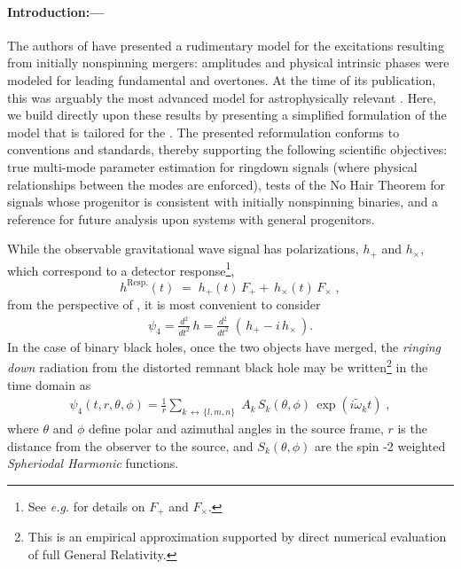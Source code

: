 \documentclass[twocolumn,prd,floatfix,preprintnumbers,a4paper,nofootinbib,superscriptaddress]{revtex4-1}
\newcommand{\cw}{\tilde{\omega}}
\begin{document}
\paragraph{Introduction:---}
%
\par The authors of \cite{London:2014cma} have presented a rudimentary model for the \qnm{} excitations resulting from initially nonspinning \bhb{} mergers: \qnm{} amplitudes and physical intrinsic phases were modeled for leading fundamental  and overtones.
%
At the time of its publication, this was arguably the most advanced model for astrophysically relevant \bh{} .
%
Here, we build directly upon these results by presenting a simplified formulation of the model that is tailored for the \lal{}.
%
The presented reformulation conforms to \lal{} conventions and standards, thereby supporting the following scientific objectives:
%
true multi-mode parameter estimation for ringdown signals (where physical relationships between the modes are enforced),
%
tests of the No Hair Theorem for \gw{} signals whose progenitor is consistent with initially nonspinning \bh{} binaries,
%
and a reference for future \qnm{} analysis upon systems with general progenitors.
%
\par While the observable gravitational wave signal has polarizations, $h_+$ and $h_\times$, which correspond to a detector response\footnote{See \textit{e.g.} \cite{Anderson:2000yy} for details on $F_+$ and $F_\times$.},
%
\[
		h^{\mathrm{Resp.}}(t) \; = \; h_+(t) \, F_+ + \, h_\times(t) \, F_\times \; ,
\]
%
from the perspective of \nr{}, it is most convenient to consider
%
\begin{align}
		\psi_4 = \frac{ d^2 }{ dt^2 } \, h = \frac{d^2}{dt^2} \; \left( \, h_+ - i \, h_\times \, \right).
\end{align}
%
In the case of binary black holes, once the two objects have merged, the \textit{ringing down} radiation from the distorted remnant black hole may be written\footnote{This is an empirical approximation supported by direct numerical evaluation of full General Relativity.} in the time domain as
%
\begin{align}
	\label{eq:psi4pt}
		\psi_4(t,r,\theta,\phi) = \frac{1}{r} \sum_{ k \, \leftrightarrow \, \{l,m,n\} } \; A_k \, S_k(\theta,\phi) \, \exp{( i \cw_k t )} \; ,
\end{align}
%
where $\theta$ and $\phi$ define polar and azimuthal angles in the source frame, $r$ is the distance from the observer to the source, and $S_k(\theta,\phi)$ are the spin -2 weighted \textit{Spheriodal Harmonic} functions.
\end{document}
